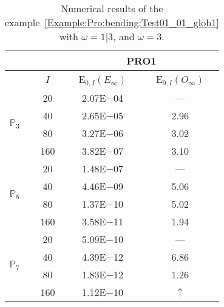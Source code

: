 \begin{table}[H]
\caption{Numerical results of the example~\ref{Example:Pro:bending:Test01_01_glob1} with $\omega=1|3$, and $\omega=3$.}
\setlength{\tabcolsep}{5pt}
\centering
\begin{tabular}{@{}l c c c@{}}
\toprule
 &  & \multicolumn{2}{c}{PRO1}\\
\midrule
 & $I$ & E$_{0,I}(E_{\infty})$ & E$_{0,I}(O_{\infty})$\\
\midrule
\multirow{4}{*}{$\mathbb{P}_{3}$} & 20 & 2.07E$-$04 & ---\\
 & 40 & 2.65E$-$05 & 2.96\\
 & 80 & 3.27E$-$06 & 3.02\\
 & 160 & 3.82E$-$07 & 3.10\\
\midrule
\multirow{4}{*}{$\mathbb{P}_{5}$} & 20 & 1.48E$-$07 & ---\\
 & 40 & 4.46E$-$09 & 5.06\\
 & 80 & 1.37E$-$10 & 5.02\\
 & 160 & 3.58E$-$11 & 1.94\\
\midrule
\multirow{4}{*}{$\mathbb{P}_{7}$} & 20 & 5.09E$-$10 & ---\\
 & 40 & 4.39E$-$12 & 6.86\\
 & 80 & 1.83E$-$12 & 1.26\\
 & 160 & 1.12E$-$10 & $\uparrow$\\
\bottomrule
\end{tabular}
\label{Table:PRO:test_01_01_test15}
\end{table}
